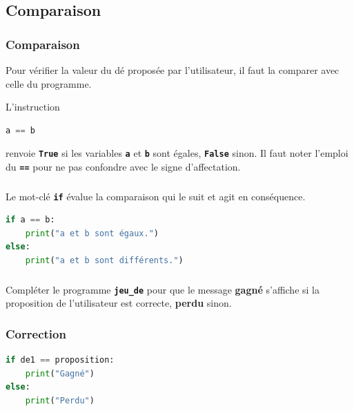\documentclass[svgnames,11pt]{beamer}
\begin{document}
\subsection{Comparaison}
\begin{frame}[fragile]
    \frametitle{Comparaison}
    Pour vérifier la valeur du dé proposée par l'utilisateur, il faut la comparer avec celle du programme.

    \begin{aretenir}[]
        L'instruction
        \begin{lstlisting}[language=Python , basicstyle=\ttfamily\small, xleftmargin=1em, xrightmargin=1em]
a == b
\end{lstlisting}
        renvoie \textbf{\texttt{True}} si les variables \textbf{\texttt{a}} et \textbf{\texttt{b}} sont égales, \textbf{\texttt{False}} sinon. Il faut noter l'emploi du \textbf{\texttt{==}} pour ne pas confondre avec le signe d'affectation.
    \end{aretenir}


\end{frame}
\begin{frame}[fragile]
    \frametitle{}
    \begin{aretenir}[]
        Le mot-clé \textbf{\texttt{if}} évalue la comparaison qui le suit et agit en conséquence.
    \end{aretenir}
    \begin{center}
        \begin{lstlisting}[language=Python , basicstyle=\ttfamily\small, xleftmargin=2em, xrightmargin=2em]
if a == b:
    print("a et b sont égaux.")
else:
    print("a et b sont différents.")
\end{lstlisting}
        \label{CODE}
    \end{center}

\end{frame}
\begin{frame}
    \frametitle{}

    \begin{activite}
        Compléter le programme \textbf{\texttt{jeu\_de}} pour que le message \textbf{gagné} s'affiche si la proposition de l'utilisateur est correcte, \textbf{perdu} sinon.
    \end{activite}

\end{frame}
\begin{frame}[fragile]
    \frametitle{Correction}

    \begin{center}
        \begin{lstlisting}[language=Python , basicstyle=\ttfamily\small, xleftmargin=2em, xrightmargin=2em]
if de1 == proposition:
    print("Gagné")
else:
    print("Perdu")
\end{lstlisting}
    \end{center}

\end{frame}
\end{document}

